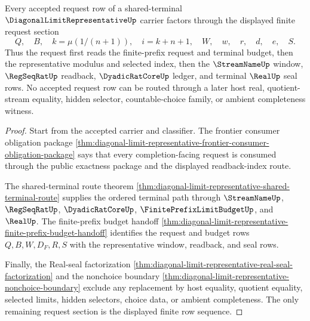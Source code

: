 \begin{theorem}
\label{thm:diagonal-limit-representative-finite-request-section-exactness}
Every accepted request row of a shared-terminal $\DiagonalLimitRepresentativeUp$ carrier factors through the displayed finite request section
$$
Q,\quad B,\quad k=\mu(1/(n+1)),\quad i=k+n+1,\quad W,\quad w,\quad r,\quad d,\quad e,\quad S.
$$
Thus the request first reads the finite-prefix request and terminal budget, then the representative modulus and selected index, then the $\StreamNameUp$ window, $\RegSeqRatUp$ readback, $\DyadicRatCoreUp$ ledger, and terminal $\RealUp$ seal rows. No accepted request row can be routed through a later host real, quotient-stream equality, hidden selector, countable-choice family, or ambient completeness witness.
\end{theorem}
\begin{proof}
Start from the accepted carrier and classifier. The frontier consumer obligation package \autoref{thm:diagonal-limit-representative-frontier-consumer-obligation-package} says that every completion-facing request is consumed through the public exactness package and the displayed readback-index route.

The shared-terminal route theorem \autoref{thm:diagonal-limit-representative-shared-terminal-route} supplies the ordered terminal path through $\StreamNameUp$, $\RegSeqRatUp$, $\DyadicRatCoreUp$, $\FinitePrefixLimitBudgetUp$, and $\RealUp$. The finite-prefix budget handoff \autoref{thm:diagonal-limit-representative-finite-prefix-budget-handoff} identifies the request and budget rows $Q,B,W,D_F,R,S$ with the representative window, readback, and seal rows.

Finally, the Real-seal factorization \autoref{thm:diagonal-limit-representative-real-seal-factorization} and the nonchoice boundary \autoref{thm:diagonal-limit-representative-nonchoice-boundary} exclude any replacement by host equality, quotient equality, selected limits, hidden selectors, choice data, or ambient completeness. The only remaining request section is the displayed finite row sequence.
\end{proof}

